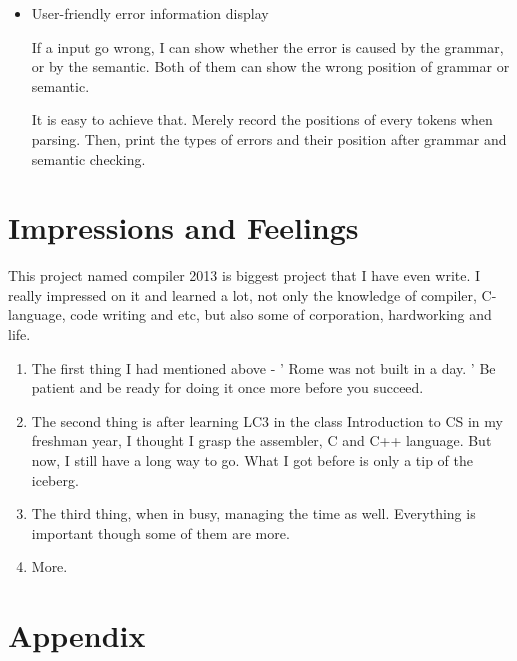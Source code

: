 \documentclass[preprint, 9pt]{sigplanconf}
\begin{document}
\begin{itemize}
        \item{User-friendly error information display}
        
            If a input go wrong, I can show whether the error is caused by the grammar, or by the semantic.
            Both of them can show the wrong position of grammar or semantic.
            
            It is easy to achieve that.
            Merely record the positions of every tokens when parsing.
            Then, print the types of errors and their position after grammar and semantic checking.

    \end{itemize}

\section{Impressions and Feelings}

    This project named compiler 2013 is biggest project that I have even write.
    I really impressed on it and learned a lot, not only the knowledge of compiler, C-language, code writing and etc, but also some of corporation, hardworking and life.

    \begin{enumerate}
    \item The first thing I had mentioned above - ' Rome was not built in a day. '
    Be patient and be ready for doing it once more before you succeed.

    \item The second thing is after learning LC3 in the class Introduction to CS in my freshman year, I thought I grasp the assembler, C and C++ language.
    But now, I still have a long way to go.
    What I got before is only a tip of the iceberg.

    \item The third thing, when in busy, managing the time as well.
    Everything is important though some of them are more.

    \item More.
    \end{enumerate}

\appendix
\section{Appendix}
\end{document}
